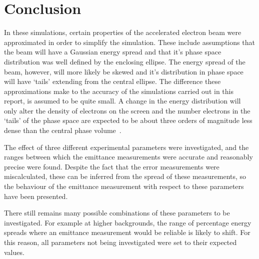 
\section{Conclusion}
\label{sec:conclusion}

In these simulations, certain properties of the accelerated electron beam were
approximated in order to simplify the simulation. These include assumptions that
the beam will have a Gaussian energy spread and that it's phase space
distribution was well defined by the enclosing ellipse. The energy spread of the
beam, however, will more likely be skewed and it's distribution in phase space
will have `tails' extending from the central ellipse. The difference these
approximations make to the accuracy of the simulations carried out in this
report, is assumed to be quite small.  A change in the energy distribution will
only alter the density of electrons on the screen and the number electrons in
the `tails' of the phase space are expected to be about three orders of
magnitude less dense than the central phase volume~\cite{deacon2016qjq}.

The effect of three different experimental parameters were investigated, and the
ranges between which the emittance measurements were accurate and reasonably
precise were found. Despite the fact that the error measurements were
miscalculated, these can be inferred from the spread of these measurements, so
the behaviour of the emittance measurement with respect to these parameters have
been presented.

There still remains many possible combinations of these parameters to be
investigated. For example at higher backgrounds, the range of percentage energy
spreads where an emittance measurement would be reliable is likely to shift. For
this reason, all parameters not being investigated were set to their expected
values.
